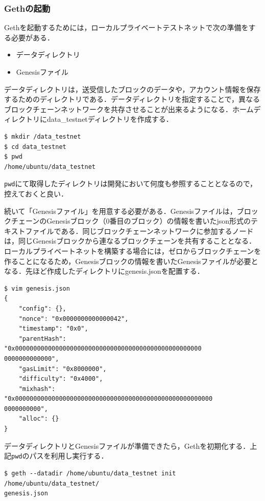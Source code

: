 \newpage

\subsubsection{Gethの起動}
Gethを起動するためには，ローカルプライベートテストネットで次の準備をする必要がある．
\begin{itemize}
\item データディレクトリ
\item Genesisファイル
\end{itemize}
データディレクトリは，送受信したブロックのデータや，アカウント情報を保存するためのディレクトリである．データディレクトリを指定することで，異なるブロックチェーンネットワークを共存させることが出来るようになる．ホームディレクトリにdata\_testnetディレクトリを作成する．
\begin{verbatim}
$ mkdir /data_testnet
$ cd data_testnet
$ pwd
/home/ubuntu/data_testnet 
\end{verbatim}
\texttt{pwd}にて取得したディレクトリは開発において何度も参照することとなるので，控えておくと良い．

続いて「Genesisファイル」を用意する必要がある．Genesisファイルは，ブロックチェーンのGenesisブロック（0番目のブロック）の情報を書いたjson形式のテキストファイルである．同じブロックチェーンネットワークに参加するノードは，同じGenesisブロックから連なるブロックチェーンを共有することとなる．ローカルプライベートネットを構築する場合には，ゼロからブロックチェーンを作ることになるため，Genesisブロックの情報を書いたGenesisファイルが必要となる．先ほど作成したディレクトリにgenesis.jsonを配置する．
\begin{verbatim}
$ vim genesis.json
{
	"config": {},
	"nonce": "0x0000000000000042",
	"timestamp": "0x0",
	"parentHash": "0x000000000000000000000000000000000000000000000000000
0000000000000",
	"gasLimit": "0x8000000",
	"difficulty": "0x4000",
	"mixhash": "0x000000000000000000000000000000000000000000000000000000
0000000000",
	"alloc": {}
}
\end{verbatim}

データディレクトリとGenesisファイルが準備できたら，Gethを初期化する．上記\texttt{pwd}のパスを利用し実行する．
\begin{verbatim}
$ geth --datadir /home/ubuntu/data_testnet init /home/ubuntu/data_testnet/
genesis.json
\end{verbatim}

